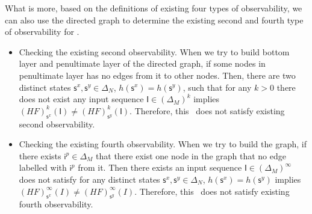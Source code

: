 What is more, based on the definitions of existing four types of observability, we can also use the directed graph to determine the existing second and fourth type of observability for \BCNs. 
\begin{itemize}
 \item Checking the existing second observability. When we try to build bottom layer and penultimate layer of the directed graph, if some nodes in penultimate layer has no edges from it to other nodes. 
 Then, there are two distinct states $\mathsf{s}^x, \mathsf{s}^y \in \Delta_N$, $h(\mathsf{s}^x)=h(\mathsf{s}^y)$, such that for any $k>0$ there does not exist any input sequence $\mathsf{I}\in(\Delta_M)^k$ implies $(HF)^k_{\mathsf{s}^x}(\mathsf{I})\neq (HF)^k_{\mathsf{s}^y}(\mathsf{I})$.
 Therefore, this \BCN\ does not satisfy existing second observability.
 \item  Checking the existing fourth observability. When we try to build the graph, if there exists $\mathsf{i}^p \in \Delta_M$ that there exist one node in the graph that no edge labelled with $\mathsf{i}^p$ from it.
 Then there exists an input sequence $\mathsf{I}\in(\Delta_M)^{\infty}$ does not satisfy for any distinct states $\mathsf{s}^x, \mathsf{s}^y \in \Delta_N$, $h(\mathsf{s}^x)=h(\mathsf{s}^y)$ implies $(HF)^{\infty}_{\mathsf{s}^x}(I)\neq (HF)^{\infty}_{\mathsf{s}^y}(I)$. Therefore, this \BCN\ does not satisfy existing fourth observability.
 \end{itemize}

